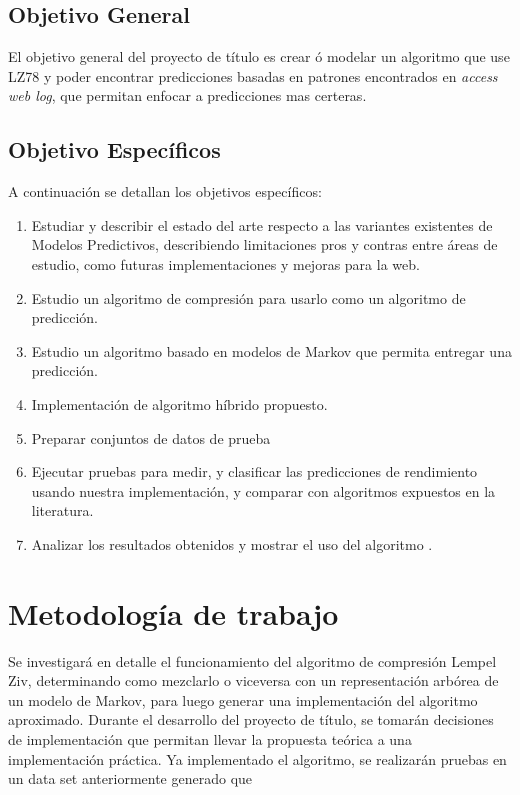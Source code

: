 \documentclass{udparticle}
\begin{document}
\subsection{Objetivo General}
 
El objetivo general del proyecto de título es crear ó modelar un algoritmo que use LZ78 y  poder encontrar predicciones basadas en patrones encontrados en \emph{access web log}, que permitan enfocar a predicciones mas certeras.
 
\subsection{Objetivo  Específicos }
 
A continuación se detallan los objetivos específicos:
 
\begin{enumerate}
  \item Estudiar y describir el estado del arte respecto a las variantes existentes de Modelos Predictivos, describiendo limitaciones pros y contras entre áreas de estudio, como futuras implementaciones y mejoras para la web.
  \item Estudio un algoritmo de compresión para usarlo como un algoritmo de predicción.
  \item Estudio un algoritmo basado en modelos de Markov que permita entregar una predicción.
  \item Implementación de algoritmo híbrido propuesto.
  \item Preparar conjuntos de datos de prueba 
  \item Ejecutar pruebas para medir, y clasificar las predicciones de rendimiento usando nuestra implementación, y comparar con algoritmos expuestos en la literatura.
  \item Analizar los resultados obtenidos y mostrar el uso del algoritmo .
\end{enumerate}


\section{Metodología de trabajo}

Se investigará en detalle el funcionamiento del algoritmo de compresión Lempel Ziv, determinando como mezclarlo o viceversa con un representación arbórea de un modelo de Markov, para luego generar una implementación del algoritmo aproximado.
Durante el desarrollo del proyecto de título, se tomarán decisiones de implementación que permitan llevar la propuesta teórica a una implementación práctica. Ya implementado el algoritmo, se realizarán pruebas en un data set anteriormente generado que 
\end{document}

